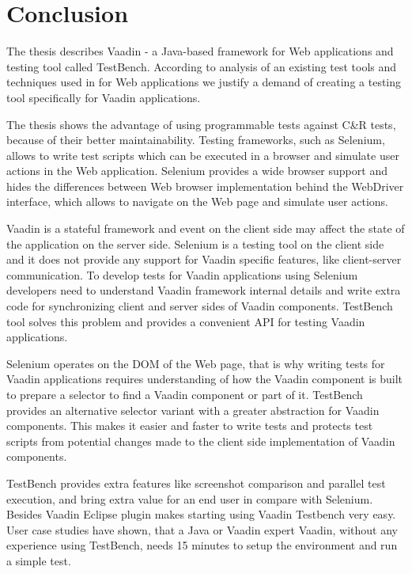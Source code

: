 \chapter {Conclusion}
\label{ch:conclusion}
 The thesis describes Vaadin - a Java-based framework for Web applications and
testing tool called TestBench.
 According to analysis of an existing test tools and techniques used in for Web
applications we justify a demand of creating a testing tool specifically
for Vaadin applications. 

The thesis shows the advantage of using programmable tests against C\&R tests,
because of their better maintainability. Testing frameworks, such as Selenium,
allows to write test scripts which can be executed in a browser and simulate
user actions in the Web application. Selenium provides a wide browser support
and hides the differences between Web browser implementation behind the
WebDriver interface, which allows to navigate on the Web page and simulate user
actions.

Vaadin is a stateful framework and event on the client side may affect the state
of the application on the server side. Selenium is a testing tool on the client
side and it does not provide any support for Vaadin specific features, like
client-server communication. To develop tests for Vaadin applications using
Selenium developers need to understand Vaadin framework internal details and 
write extra code for synchronizing client and server sides of Vaadin components.
TestBench tool solves this problem and provides a convenient API for testing Vaadin applications.

Selenium operates on the DOM of the Web page, that is why writing tests for
Vaadin applications requires understanding of how the Vaadin component is
built to prepare a selector to find a Vaadin component or part of it. TestBench
provides an alternative selector variant with a greater abstraction for Vaadin components.
This makes it easier and faster to write tests and protects test scripts from potential
changes made to the client side implementation of Vaadin components.

TestBench provides extra features like screenshot comparison and
parallel test execution, and bring extra value for an end user in compare with
Selenium. Besides Vaadin Eclipse plugin makes starting using Vaadin Testbench
very easy. User case studies have shown, that a Java or Vaadin expert Vaadin, without any experience using TestBench, needs 15 minutes to setup the
 environment and run a simple test.

